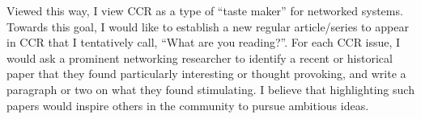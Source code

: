\documentclass[11pt]{article}
\begin{document}
Viewed this way, I view CCR as a type of “taste maker” for networked systems. Towards this goal, I would like to establish a new regular article/series to appear in CCR that I tentatively call, “What are you reading?”. For each CCR issue, I would ask a prominent networking researcher to identify a recent or historical paper that they found particularly interesting or thought provoking, and write a paragraph or two on what they found stimulating. I believe that highlighting such papers would inspire others in the community to pursue ambitious ideas.
\end{document}
